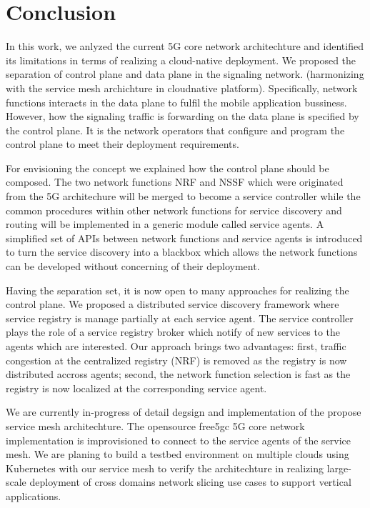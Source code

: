 \documentclass[a4paper]{article}
\begin{document}
\section{Conclusion}

In this work, we anlyzed the current 5G core network architechture and identified its limitations in terms of realizing a cloud-native deployment. We proposed the separation of control plane and data plane in the signaling network. (harmonizing with the service mesh archichture in cloudnative platform). Specifically, network functions interacts in the data plane to fulfil the mobile application bussiness. However, how the signaling traffic is forwarding on the data plane is specified by the control plane. It is the network operators that configure and program the control plane to meet their deployment requirements.

For envisioning the concept we explained how the control plane should be composed. The two network functions NRF and NSSF which were originated from the 5G architechure will be merged to become a service controller while the common procedures within other network functions for service discovery and routing will be implemented in a generic module called service agents. A simplified set of APIs between network functions and service agents is introduced to turn the service discovery into a blackbox which allows the network functions can be developed without concerning of their deployment.

Having the separation set, it is now open to many approaches for realizing the control plane. We proposed a distributed service discovery framework where service registry is manage partially at each service agent. The service controller plays the role of a service registry broker which notify of new services to the agents which are interested. Our approach brings two advantages: first, traffic congestion at the centralized registry (NRF) is removed as the registry is now distributed accross agents; second, the network function selection is fast as the registry is now localized at the corresponding service agent.

We are currently in-progress of detail degsign and implementation of the propose service mesh architechture. The opensource free5gc 5G core network implementation is improvisioned to connect to the service agents of the service mesh. We are planing to build a testbed environment on multiple clouds using Kubernetes with our service mesh to verify the architechture in realizing large-scale deployment of cross domains network slicing use cases to support vertical applications.
\end{document}
